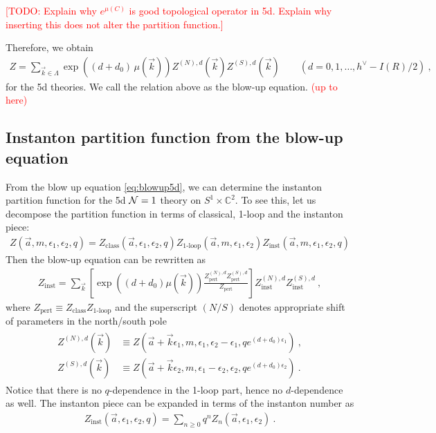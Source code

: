 \documentclass[letterpaper, 11pt]{article}
\def\IC{\mathbb{C}}
\def\CN{{\cal N}}
\def\e{\epsilon}
\begin{document}
\textcolor{red}{[TODO: Explain why $e^{\mu(C)}$ is good topological operator in 5d. Explain why inserting this does not alter the partition function.]}

Therefore, we obtain
\begin{align} \label{eq:blowup5d}
 Z = \sum_{\vec{k} \in \Lambda} \exp\left( (d+d_0)\, \mu(\vec{k}) \right) Z^{(N), d}(\vec{k})  Z^{(S), d}(\vec{k})  \qquad (d=0, 1, \ldots, h^\vee - I(R)/2 ) \ , 
\end{align} 
for the 5d theories. We call the relation above as the blow-up equation.  \textcolor{red}{(up to here)}

\subsection{Instanton partition function from the blow-up equation}
\label{subsec:recursion}
From the blow up equation \eqref{eq:blowup5d}, we can determine the instanton partition function for the 5d $\CN=1$ theory on $S^1 \times \IC^2$. To see this, let us decompose the partition function in terms of classical, 1-loop and the instanton piece:
\begin{align}
 Z(\vec{a}, m, \e_1, \e_2, q) = Z_{\textrm{class}}(\vec{a}, \e_1, \e_2, q) Z_{\textrm{1-loop}} (\vec{a}, m, \e_1, \e_2) Z_{\textrm{inst}}(\vec{a}, m, \e_1, \e_2, q)
\end{align}
Then the blow-up equation can be rewritten as
\begin{align}
 Z_{\textrm{inst}} = \sum_{\vec{k}} \left[ \exp\left( (d+d_0) \mu(\vec{k}) \right)  \frac{Z^{(N), d}_{\textrm{pert}} Z^{(S), d}_{\textrm{pert}}}{Z_{\textrm{pert}}} \right] Z^{(N), d}_{\textrm{inst}} Z^{(S), d}_{\textrm{inst}}  \ , 
\end{align}
where $Z_{\textrm{pert}} \equiv Z_{\textrm{class}} Z_{\textrm{1-loop}}$ and the superscript $(N/S)$ denotes appropriate shift of parameters in the north/south pole 
\begin{align}
\begin{split}
 Z^{(N), d}(\vec{k}) &\equiv Z(\vec{a}+\vec{k} \e_1, m, \e_1, \e_2-\e_1, q e^{(d+d_0)\e_1}) \ , \\
 Z^{(S), d}(\vec{k}) &\equiv Z(\vec{a}+\vec{k} \e_2, m, \e_1 - \e_2, \e_2, q e^{(d+d_0)\e_2}) \ . 
\end{split}
\end{align}
 Notice that there is no $q$-dependence in the 1-loop part, hence no $d$-dependence as well. 
The instanton piece can be expanded in terms of the instanton number as
\begin{align}
 Z_{\textrm{inst}} (\vec{a}, \e_1, \e_2, q) = \sum_{n \ge 0} q^n Z_n (\vec{a}, \e_1, \e_2) \ . 
\end{align}
\end{document}
